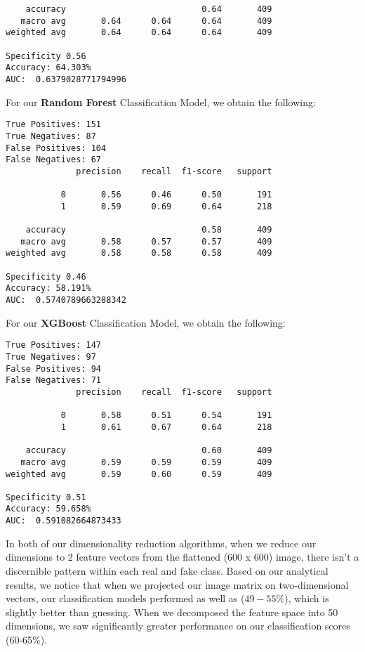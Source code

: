 \documentclass{article}
\begin{document}
\begin{titlepage}
\begin{itemize}
\begin{verbatim}
    accuracy                           0.64       409
   macro avg       0.64      0.64      0.64       409
weighted avg       0.64      0.64      0.64       409

Specificity 0.56
Accuracy: 64.303%
AUC:  0.6379028771794996
\end{verbatim}

For our \textbf{Random Forest} Classification Model, we obtain the following:

\begin{verbatim}
True Positives: 151
True Negatives: 87
False Positives: 104
False Negatives: 67
              precision    recall  f1-score   support

           0       0.56      0.46      0.50       191
           1       0.59      0.69      0.64       218

    accuracy                           0.58       409
   macro avg       0.58      0.57      0.57       409
weighted avg       0.58      0.58      0.58       409

Specificity 0.46
Accuracy: 58.191%
AUC:  0.5740789663288342
\end{verbatim}

For our \textbf{XGBoost} Classification Model, we obtain the following:

\begin{verbatim}
True Positives: 147
True Negatives: 97
False Positives: 94
False Negatives: 71
              precision    recall  f1-score   support

           0       0.58      0.51      0.54       191
           1       0.61      0.67      0.64       218

    accuracy                           0.60       409
   macro avg       0.59      0.59      0.59       409
weighted avg       0.59      0.60      0.59       409

Specificity 0.51
Accuracy: 59.658%
AUC:  0.591082664873433
\end{verbatim}


In both of our dimensionality reduction algorithms, when we reduce our dimensions to 2 feature vectors from the flattened (600 x 600) image, there isn't a discernible pattern within each real and fake class. Based on our analytical results, we notice that when we projected our image matrix on two-dimensional vectors, our classification models performed as well as ($49-55\%$), which is slightly better than guessing. When we decomposed the feature space into 50 dimensions, we saw significantly greater performance on our classification scores (60-65\%).


\end{itemize}
\end{titlepage}
\end{document}
